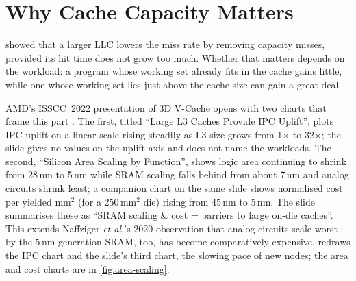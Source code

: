 \section{Why Cache Capacity Matters}
\label{sec:why-cache-capacity}

 showed that a larger LLC lowers the miss rate by removing capacity misses, provided its hit time does not grow too much. Whether that matters depends on the workload: a program whose working set already fits in the cache gains little, while one whose working set lies just above the cache size can gain a great deal.

AMD's ISSCC~2022 presentation of 3D V-Cache opens with two charts that frame this part \cite[slides~5--6]{wuu2022vcache}. The first, titled ``Large L3 Caches Provide IPC Uplift'', plots IPC uplift on a linear scale rising steadily as L3 size grows from 1$\times$ to 32$\times$; the slide gives no values on the uplift axis and does not name the workloads. The second, ``Silicon Area Scaling by Function'', shows logic area continuing to shrink from 28\,nm to 5\,nm while SRAM scaling falls behind from about 7\,nm and analog circuits shrink least; a companion chart on the same slide shows normalised cost per yielded mm$^2$ (for a 250\,mm$^2$ die) rising from 45\,nm to 5\,nm. The slide summarises these as ``SRAM scaling \& cost = barriers to large on-die caches''. This extends Naffziger \emph{et al.}'s 2020 observation that analog circuits scale worst \cite{naffziger2020chiplet}: by the 5\,nm generation SRAM, too, has become comparatively expensive.  redraws the IPC chart and the slide's third chart, the slowing pace of new nodes; the area and cost charts are in \cref{fig:area-scaling}.


